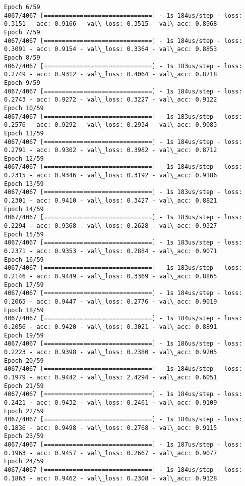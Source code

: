 \documentclass[11pt]{article}
\begin{document}
\begin{Verbatim}[commandchars=\\\{\}]
Epoch 6/59
4067/4067 [==============================] - 1s 184us/step - loss: 0.3151 - acc: 0.9166 - val\_loss: 0.3515 - val\_acc: 0.8968
Epoch 7/59
4067/4067 [==============================] - 1s 184us/step - loss: 0.3091 - acc: 0.9154 - val\_loss: 0.3364 - val\_acc: 0.8853
Epoch 8/59
4067/4067 [==============================] - 1s 183us/step - loss: 0.2749 - acc: 0.9312 - val\_loss: 0.4064 - val\_acc: 0.8718
Epoch 9/59
4067/4067 [==============================] - 1s 184us/step - loss: 0.2743 - acc: 0.9272 - val\_loss: 0.3227 - val\_acc: 0.9122
Epoch 10/59
4067/4067 [==============================] - 1s 183us/step - loss: 0.2576 - acc: 0.9292 - val\_loss: 0.2934 - val\_acc: 0.9083
Epoch 11/59
4067/4067 [==============================] - 1s 184us/step - loss: 0.2791 - acc: 0.9302 - val\_loss: 0.3982 - val\_acc: 0.8712
Epoch 12/59
4067/4067 [==============================] - 1s 184us/step - loss: 0.2315 - acc: 0.9346 - val\_loss: 0.3192 - val\_acc: 0.9186
Epoch 13/59
4067/4067 [==============================] - 1s 183us/step - loss: 0.2301 - acc: 0.9410 - val\_loss: 0.3427 - val\_acc: 0.8821
Epoch 14/59
4067/4067 [==============================] - 1s 183us/step - loss: 0.2294 - acc: 0.9368 - val\_loss: 0.2628 - val\_acc: 0.9327
Epoch 15/59
4067/4067 [==============================] - 1s 183us/step - loss: 0.2371 - acc: 0.9353 - val\_loss: 0.2884 - val\_acc: 0.9071
Epoch 16/59
4067/4067 [==============================] - 1s 183us/step - loss: 0.2146 - acc: 0.9449 - val\_loss: 0.3369 - val\_acc: 0.8865
Epoch 17/59
4067/4067 [==============================] - 1s 184us/step - loss: 0.2065 - acc: 0.9447 - val\_loss: 0.2776 - val\_acc: 0.9019
Epoch 18/59
4067/4067 [==============================] - 1s 184us/step - loss: 0.2056 - acc: 0.9420 - val\_loss: 0.3021 - val\_acc: 0.8891
Epoch 19/59
4067/4067 [==============================] - 1s 186us/step - loss: 0.2223 - acc: 0.9398 - val\_loss: 0.2380 - val\_acc: 0.9205
Epoch 20/59
4067/4067 [==============================] - 1s 184us/step - loss: 0.1979 - acc: 0.9442 - val\_loss: 2.4294 - val\_acc: 0.6051
Epoch 21/59
4067/4067 [==============================] - 1s 184us/step - loss: 0.2421 - acc: 0.9432 - val\_loss: 0.2461 - val\_acc: 0.9109
Epoch 22/59
4067/4067 [==============================] - 1s 184us/step - loss: 0.1836 - acc: 0.9498 - val\_loss: 0.2768 - val\_acc: 0.9115
Epoch 23/59
4067/4067 [==============================] - 1s 187us/step - loss: 0.1963 - acc: 0.9457 - val\_loss: 0.2667 - val\_acc: 0.9077
Epoch 24/59
4067/4067 [==============================] - 1s 184us/step - loss: 0.1863 - acc: 0.9462 - val\_loss: 0.2308 - val\_acc: 0.9128

\end{Verbatim}
\end{document}
